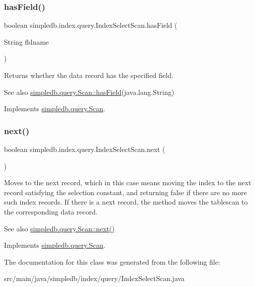 \subsubsection{\texorpdfstring{has\+Field()}{hasField()}}
{\footnotesize\ttfamily boolean simpledb.\+index.\+query.\+Index\+Select\+Scan.\+has\+Field (\begin{DoxyParamCaption}\item[{String}]{fldname }\end{DoxyParamCaption})\hspace{0.3cm}{\ttfamily [inline]}}

Returns whether the data record has the specified field. \begin{DoxySeeAlso}{See also}
\hyperlink{interfacesimpledb_1_1query_1_1Scan_a8f4ccf13eed0bed983c928e9b998fe5c}{simpledb.\+query.\+Scan\+::has\+Field}(java.\+lang.\+String) 
\end{DoxySeeAlso}


Implements \hyperlink{interfacesimpledb_1_1query_1_1Scan_a8f4ccf13eed0bed983c928e9b998fe5c}{simpledb.\+query.\+Scan}.

\mbox{\label{classsimpledb_1_1index_1_1query_1_1IndexSelectScan_af642270c5b38d4c87d6a60218660b60e}} 
\subsubsection{\texorpdfstring{next()}{next()}}
{\footnotesize\ttfamily boolean simpledb.\+index.\+query.\+Index\+Select\+Scan.\+next (\begin{DoxyParamCaption}{ }\end{DoxyParamCaption})\hspace{0.3cm}{\ttfamily [inline]}}

Moves to the next record, which in this case means moving the index to the next record satisfying the selection constant, and returning false if there are no more such index records. If there is a next record, the method moves the tablescan to the corresponding data record. \begin{DoxySeeAlso}{See also}
\hyperlink{interfacesimpledb_1_1query_1_1Scan_a5fc77b7c76d91f89f6c09ac4f15ef351}{simpledb.\+query.\+Scan\+::next()} 
\end{DoxySeeAlso}


Implements \hyperlink{interfacesimpledb_1_1query_1_1Scan_a5fc77b7c76d91f89f6c09ac4f15ef351}{simpledb.\+query.\+Scan}.



The documentation for this class was generated from the following file\+:\begin{DoxyCompactItemize}
\item 
src/main/java/simpledb/index/query/Index\+Select\+Scan.\+java\end{DoxyCompactItemize}
